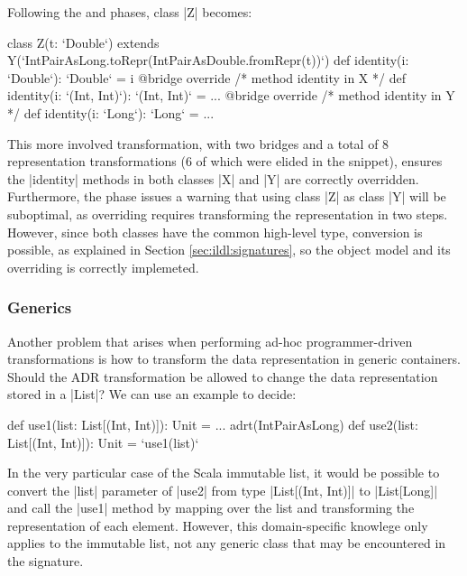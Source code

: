 Following the \coerce{} and \commit{} phases, class |Z| becomes:

\begin{lstlisting-nobreak}
class Z(t: `Double`) extends Y(`IntPairAsLong.toRepr(IntPairAsDouble.fromRepr(t))`) {
  def identity(i: `Double`): `Double` = i
  @bridge override /* method identity in X */
  def identity(i: `(Int, Int)`): `(Int, Int)` = ...
  @bridge override /* method identity in Y */
  def identity(i: `Long`): `Long` = ...
}
\end{lstlisting-nobreak}

This more involved transformation, with two bridges and a total of 8 representation transformations (6 of which were elided in the snippet), ensures the |identity| methods in both classes |X| and |Y| are correctly overridden. Furthermore, the \bridge{} phase issues a warning that using class |Z| as class |Y| will be suboptimal, as overriding requires transforming the representation in two steps. However, since both classes have the common high-level type, conversion is possible, as explained in Section \ref{sec:ildl:signatures}, so the object model and its overriding is correctly implemeted.

\subsubsection{Generics}
Another problem that arises when performing ad-hoc programmer-driven transformations is how to transform the data representation in generic containers. Should the ADR transformation be allowed to change the data representation stored in a |List|? We can use an example to decide:

\begin{lstlisting-nobreak}
def use1(list: List[(Int, Int)]): Unit = ...
adrt(IntPairAsLong) {
  def use2(list: List[(Int, Int)]): Unit = `use1(list)`
}
\end{lstlisting-nobreak}

In the very particular case of the Scala immutable list, it would be possible to convert the |list| parameter of |use2| from type |List[(Int, Int)]| to |List[Long]| and call the |use1| method by mapping over the list and transforming the representation of each element. However, this domain-specific knowlege only applies to the immutable list, not any generic class that may be encountered in the signature.

